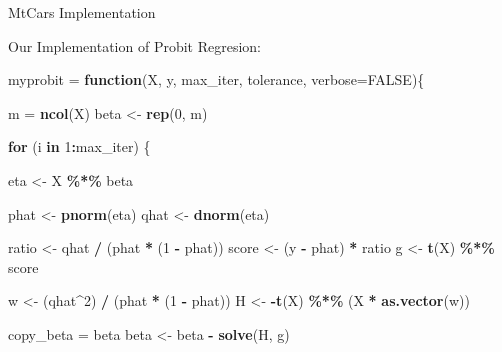 \documentclass[
  ignorenonframetext,
]{beamer}
\newenvironment{Shaded}{\begin{snugshade}}{\end{snugshade}}
\newcommand{\AttributeTok}[1]{\textcolor[rgb]{0.13,0.29,0.53}{#1}}
\newcommand{\ConstantTok}[1]{\textcolor[rgb]{0.56,0.35,0.01}{#1}}
\newcommand{\ControlFlowTok}[1]{\textcolor[rgb]{0.13,0.29,0.53}{\textbf{#1}}}
\newcommand{\DecValTok}[1]{\textcolor[rgb]{0.00,0.00,0.81}{#1}}
\newcommand{\FunctionTok}[1]{\textcolor[rgb]{0.13,0.29,0.53}{\textbf{#1}}}
\newcommand{\NormalTok}[1]{#1}
\newcommand{\OtherTok}[1]{\textcolor[rgb]{0.56,0.35,0.01}{#1}}
\newcommand{\SpecialCharTok}[1]{\textcolor[rgb]{0.81,0.36,0.00}{\textbf{#1}}}
\begin{document}
\begin{frame}[fragile]{MtCars Implementation}
\begin{block}{Our Implementation of Probit Regresion:}
\protect{}\label{our-implementation-of-probit-regresion}
\begin{Shaded}
\begin{Highlighting}[]
\NormalTok{myprobit }\OtherTok{=} \ControlFlowTok{function}\NormalTok{(X, y, max\_iter, tolerance, }\AttributeTok{verbose=}\ConstantTok{FALSE}\NormalTok{)\{}

\NormalTok{  m }\OtherTok{=} \FunctionTok{ncol}\NormalTok{(X)}
\NormalTok{  beta }\OtherTok{\textless{}{-}} \FunctionTok{rep}\NormalTok{(}\DecValTok{0}\NormalTok{, m)}
  
  \ControlFlowTok{for}\NormalTok{ (i }\ControlFlowTok{in} \DecValTok{1}\SpecialCharTok{:}\NormalTok{max\_iter) \{}
    
\NormalTok{    eta }\OtherTok{\textless{}{-}}\NormalTok{ X }\SpecialCharTok{\%*\%}\NormalTok{ beta}
    
\NormalTok{    phat }\OtherTok{\textless{}{-}} \FunctionTok{pnorm}\NormalTok{(eta)}
\NormalTok{    qhat }\OtherTok{\textless{}{-}} \FunctionTok{dnorm}\NormalTok{(eta)}
    
\NormalTok{    ratio }\OtherTok{\textless{}{-}}\NormalTok{ qhat }\SpecialCharTok{/}\NormalTok{ (phat }\SpecialCharTok{*}\NormalTok{ (}\DecValTok{1} \SpecialCharTok{{-}}\NormalTok{ phat))}
\NormalTok{    score }\OtherTok{\textless{}{-}}\NormalTok{ (y }\SpecialCharTok{{-}}\NormalTok{ phat) }\SpecialCharTok{*}\NormalTok{ ratio}
\NormalTok{    g }\OtherTok{\textless{}{-}} \FunctionTok{t}\NormalTok{(X) }\SpecialCharTok{\%*\%}\NormalTok{ score}
    
\NormalTok{    w }\OtherTok{\textless{}{-}}\NormalTok{ (qhat}\SpecialCharTok{\^{}}\DecValTok{2}\NormalTok{) }\SpecialCharTok{/}\NormalTok{ (phat }\SpecialCharTok{*}\NormalTok{ (}\DecValTok{1} \SpecialCharTok{{-}}\NormalTok{ phat))}
\NormalTok{    H }\OtherTok{\textless{}{-}} \SpecialCharTok{{-}}\FunctionTok{t}\NormalTok{(X) }\SpecialCharTok{\%*\%}\NormalTok{ (X }\SpecialCharTok{*} \FunctionTok{as.vector}\NormalTok{(w))}
    
\NormalTok{    copy\_beta }\OtherTok{=}\NormalTok{ beta}
\NormalTok{    beta }\OtherTok{\textless{}{-}}\NormalTok{ beta }\SpecialCharTok{{-}} \FunctionTok{solve}\NormalTok{(H, g)}
    

\end{Highlighting}
\end{Shaded}
\end{block}
\end{frame}
\end{document}
